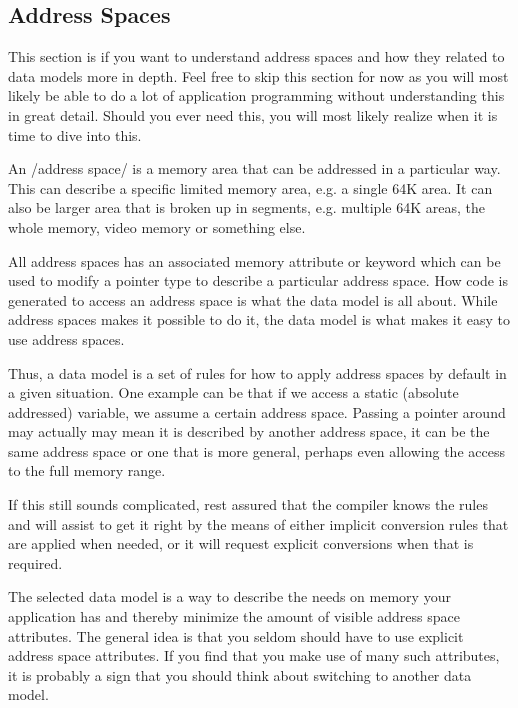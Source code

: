 \subsection*{Address Spaces}

This section is if you want to understand address spaces and how they
related to data models more in depth. Feel free to skip this section
for now as you will most likely be able to do a lot of application
programming without understanding this in great detail. Should you
ever need this, you will most likely realize when it is time to dive
into this.

An /address space/ is a memory area that can be addressed in a
particular way. This can describe a specific limited memory area,
e.g. a single 64K area. It can also be larger area that is broken up
in segments, e.g. multiple 64K areas, the whole memory, video memory
or something else.

All address spaces has an associated memory attribute or keyword which
can be used to modify a pointer type to describe a particular address
space. How code is generated to access an address space is what the
data model is all about. While address spaces makes it possible to do
it, the data model is what makes it easy to use address spaces.

Thus, a data model is a set of rules for how to apply address spaces
by default in a given situation. One example can be that if we access
a static (absolute addressed) variable, we assume a certain address
space. Passing a pointer around may actually may mean it is described
by another address space, it can be the same address space or one that
is more general, perhaps even allowing the access to the full memory
range.

If this still sounds complicated, rest assured that the compiler knows
the rules and will assist to get it right by the means of either
implicit conversion rules that are applied when needed, or it will
request explicit conversions when that is required.

The selected data model is a way to describe the needs on memory your
application has and thereby minimize the amount of visible address
space attributes. The general idea is that you seldom should have to use
explicit address space attributes. If you find that you make use of many
such attributes, it is probably a sign that you should think about
switching to another data model.
